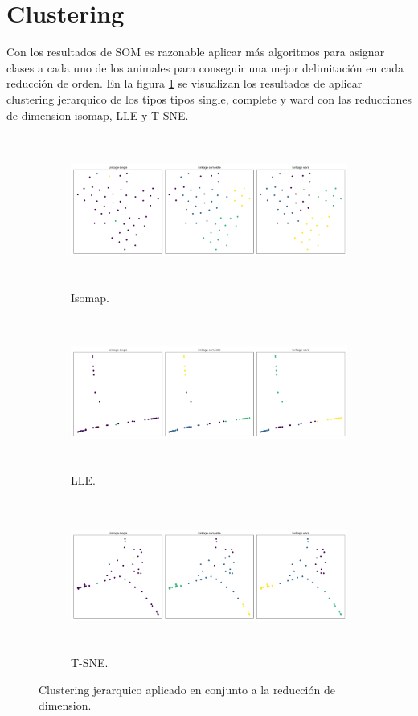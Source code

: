 \section*{Clustering}

Con los resultados de SOM es razonable aplicar más algoritmos para asignar clases a cada uno de los animales para conseguir una mejor delimitación en cada reducción de orden. En la figura \ref{fig:clustering} se visualizan los resultados de aplicar clustering jerarquico de los tipos tipos single, complete y ward con las reducciones de dimension isomap, LLE y T-SNE.

\begin{figure}[H]
    \centering
    \begin{subfigure}{17cm}
        \includegraphics[width=17cm,height=5cm]{Graphics/Cluster_isomap.png}
        \caption{Isomap.}
    \end{subfigure}
    \begin{subfigure}{17cm}
        \includegraphics[width=17cm,height=5cm]{Graphics/Cluster_LLE.png}
        \caption{LLE.}
    \end{subfigure}
    \begin{subfigure}{17cm}
        \includegraphics[width=17cm,height=5cm]{Graphics/Cluster_TSNE.png}
        \caption{T-SNE.}
    \end{subfigure}
    \caption{Clustering jerarquico aplicado en conjunto a la reducción de dimension.}
    \label{fig:clustering}
\end{figure}

